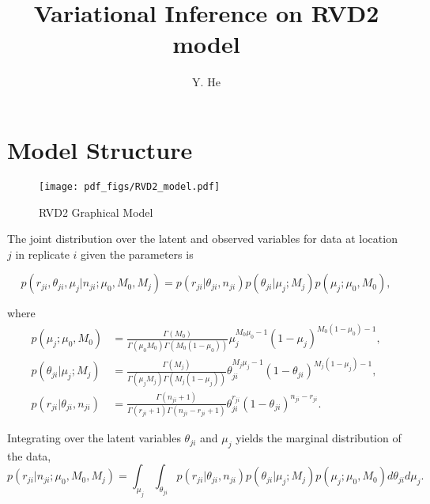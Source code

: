 \documentclass[11pt,reqno]{amsart}
\title[RVD2]{Variational Inference on RVD2 model}
\author{Y. He}
\date{}                                           %
\begin{document}
\maketitle


\section{Model Structure}\label{sec:model_structure}




\begin{figure}[h]
\begin{center}
\texttt{[image: pdf\_figs/RVD2\_model.pdf]}
\caption{RVD2 Graphical Model}
\label{fig:graphical_model}
\end{center}
\end{figure}


The joint distribution over the latent and observed variables for data at location $j$ in replicate $i$ given the parameters is

\begin{equation}\label{eqn:jointpdf}
p \left( r_{ji}, \theta_{ji}, \mu_j | n_{ji}; \mu_0, M_0, M_j \right) = p \left( r_{ji} | \theta_{ji}, n_{ji} \right) p\left( \theta_{ji} | \mu_j; M_j \right) p\left( \mu_j; \mu_0, M_0 \right),
\end{equation}

where
\begin{align}
p\left( \mu_j; \mu_0, M_0 \right)  &= \frac{ \Gamma(M_0) } { \Gamma(\mu_0 M_0) \Gamma(M_0 (1-\mu_0)) } \mu_j^{M_0\mu_0 -1} (1 - \mu_j)^{M_0 ( 1 - \mu_0) - 1}, \nonumber \\
p\left( \theta_{ji} | \mu_j; M_j \right) &= \frac{ \Gamma(M_j) } { \Gamma(\mu_j M_j) \Gamma(M_j (1-\mu_j)) } \theta_{ji}^{M_j\mu_j -1} (1 - \theta_{ji})^{M_j ( 1 - \mu_j) - 1}, \nonumber \\
p \left( r_{ji} | \theta_{ji}, n_{ji} \right) &= \frac{ \Gamma(n_{ji}+1) } { \Gamma(r_{ji}+1) \Gamma( n_{ji} - r_{ji} + 1 ) } \theta_{ji}^{r_{ji}} (1 - \theta_{ji})^{n_{ji} - r_{ji}}. \nonumber
\end{align}

Integrating over the latent variables $\theta_{ji}$ and $\mu_j$ yields the marginal distribution of the data,
\begin{equation}
p \left( r_{ji} | n_{ji} ; \mu_0, M_0, M_j \right) = \int_{\mu_j} \int_{\theta_{ji}}  p \left( r_{ji} | \theta_{ji}, n_{ji} \right) p\left( \theta_{ji} | \mu_j; M_j \right) p\left( \mu_j; \mu_0, M_0 \right) d\theta_{ji} d\mu_j.
\end{equation}
\end{document}

